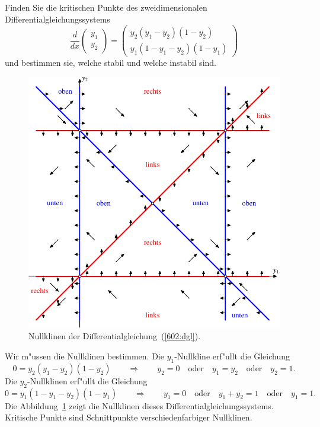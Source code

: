 Finden Sie die kritischen Punkte des zweidimensionalen
Differentialgleichungssystems
\begin{equation}
\frac{d}{dx}\begin{pmatrix}y_1\\y_2\end{pmatrix}
=
\begin{pmatrix}
y_2(y_1-y_2)(1-y_2)\\
y_1(1-y_1-y_2)(1-y_1)
\end{pmatrix}
\label{602:dgl}
\end{equation}
und bestimmen sie, welche stabil und welche instabil sind.

\begin{loesung}
\begin{figure}
\centering
\includegraphics{../skript/uebungsaufgaben/602-1.pdf}
\caption{Nullklinen der Differentialgleichung~(\ref{602:dgl}).
\label{602:nullklinen}}
\end{figure}
Wir m"ussen die Nullklinen bestimmen.
Die $y_1$-Nullkline erf"ullt die Gleichung
\[
0=y_2(y_1-y_2)(1-y_2)
\qquad\Rightarrow\qquad
y_2=0
\quad\text{oder}\quad
y_1=y_2
\quad\text{oder}\quad
y_2=1.
\]
Die $y_2$-Nullklinen erf"ullt die Gleichung
\[
0=y_1(1-y_1-y_2)(1-y_1)
\qquad\Rightarrow\qquad
y_1=0
\quad\text{oder}\quad
y_1+y_2=1
\quad\text{oder}\quad
y_1=1.
\]
Die Abbildung~\ref{602:nullklinen} zeigt die Nullklinen dieses
Differentialgleichungssystems. 
Kritische Punkte sind Schnittpunkte verschiedenfarbiger Nullklinen.


\end{loesung}
